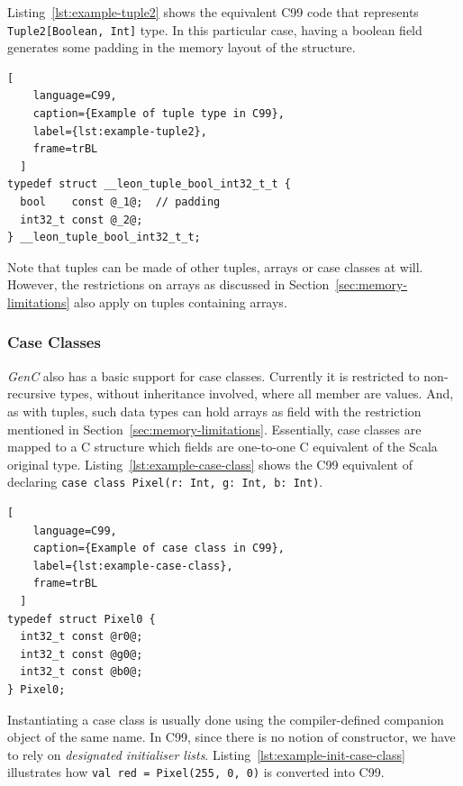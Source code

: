 \documentclass{article}
\newcommand{\inlineScala}[1]{\lstinline[language=MyScala]|#1|}
\newcommand{\GenC}{\emph{GenC}\xspace}
\begin{document}
Listing~\ref{lst:example-tuple2} shows the equivalent C99 code that represents
\inlineScala{Tuple2[Boolean, Int]} type. In this particular case, having a
boolean field generates some padding in the memory layout of the structure.

\pagebreak[3]
\begin{lstlisting}[
    language=C99,
    caption={Example of tuple type in C99},
    label={lst:example-tuple2},
    frame=trBL
  ]
typedef struct __leon_tuple_bool_int32_t_t {
  bool    const @_1@;  // padding
  int32_t const @_2@;
} __leon_tuple_bool_int32_t_t;
\end{lstlisting}

Note that tuples can be made of other tuples, arrays or case classes at will.
However, the restrictions on arrays as discussed in
Section~\ref{sec:memory-limitations} also apply on tuples containing arrays.



\subsubsection{Case Classes}
\label{sec:case-classes}

\GenC also has a basic support for case classes. Currently it is restricted to
non-recursive types, without inheritance involved, where all member are values.
And, as with tuples, such data types can hold arrays as field with the
restriction mentioned in Section~\ref{sec:memory-limitations}. Essentially, case
classes are mapped to a C structure which fields are one-to-one C equivalent of
the Scala original type. Listing~\ref{lst:example-case-class} shows the C99
equivalent of declaring \inlineScala{case class Pixel(r: Int, g: Int, b: Int)}.

\begin{lstlisting}[
    language=C99,
    caption={Example of case class in C99},
    label={lst:example-case-class},
    frame=trBL
  ]
typedef struct Pixel0 {
  int32_t const @r0@;
  int32_t const @g0@;
  int32_t const @b0@;
} Pixel0;
\end{lstlisting}

Instantiating a case class is usually done using the compiler-defined companion
object of the same name. In C99, since there is no notion of constructor, we
have to rely on \emph{designated initialiser lists}.
Listing~\ref{lst:example-init-case-class} illustrates how \inlineScala{val red =
Pixel(255, 0, 0)} is converted into C99.
\end{document}
